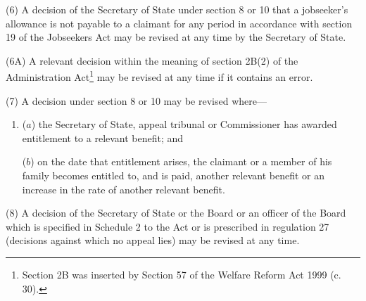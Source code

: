 \documentclass[12pt,a4paper]{article}
\begin{document}
(6) A decision of the Secretary of State under section 8 or 10 that a jobseeker’s allowance is not payable to a claimant for any period in accordance with section 19 of the Jobseekers Act may be revised at any time by the Secretary of State.

(6A) A relevant decision within the meaning of section 2B(2) of the Administration Act\footnote{\frenchspacing Section 2B was inserted by Section 57 of the Welfare Reform Act 1999 (c. 30).} may be revised at any time if it contains an error.

%

(7) A decision under section 8 or 10 may be revised where—
\begin{enumerate}\item[]
($a$) the Secretary of State, appeal tribunal or Commissioner has awarded entitlement to a relevant benefit; and

($b$) on the date that entitlement arises, the claimant or a member of his family becomes entitled to, and is paid, another relevant benefit or an increase in the rate of another relevant benefit.
\end{enumerate}

(8) A decision of the Secretary of State 
or the Board or an officer of the Board  %
which is specified in Schedule 2 to the Act or is prescribed in regulation 27 (decisions against which no appeal lies) may be revised at any time.

\end{document}
